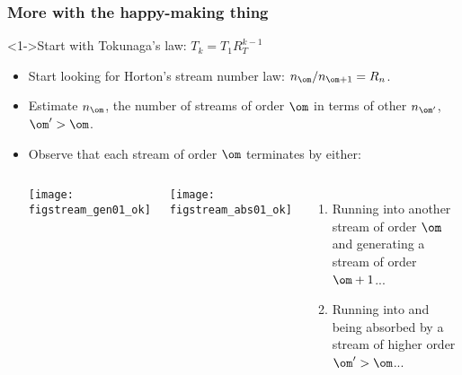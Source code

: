 \begin{frame}[label=]
  \frametitle{More with the happy-making thing}

  \begin{block}<1->{Start with Tokunaga's law: $T_k = T_1 R_T^{k-1}$}
    \begin{itemize}
    \item<2-> 
      Start looking for Horton's stream number law: \alert{$n_{\om}/n_{\om+1} = R_n$}.
    \item<3->
      Estimate $n_\om$, the number of streams of order $\om$ in terms 
      of other $n_{\om'}$, $\om'>\om$.
    \item<4-> 
      Observe that each stream of order $\om$ terminates by either:
      \begin{columns}
        \begin{overprint}
          \texttt{[image: figstream\_gen01\_ok]}
        \end{overprint}
        \begin{overprint}
          \texttt{[image: figstream\_abs01\_ok]}
        \end{overprint}
        \begin{enumerate}
        \item<5-> Running into another stream of order $\om$ and 
          generating a stream of order $\om+1$...
        \item<6-> Running into and being absorbed by a stream
          of higher order $\om'>\om$...
        \end{enumerate}
      \end{columns}
    \end{itemize}
  \end{block}

\end{frame}

